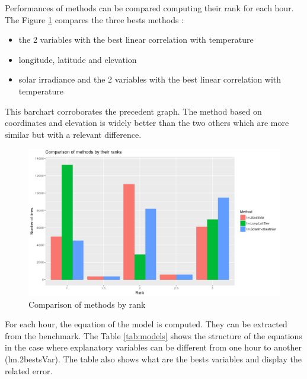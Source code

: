 \documentclass[12pt,twoside]{reedthesis}
\providecommand{\tightlist}{%
  \setlength{\itemsep}{0pt}\setlength{\parskip}{0pt}}
\theoremstyle{definition}
\theoremstyle{definition}
\theoremstyle{definition}
\theoremstyle{remark}
\begin{document}
Performances of methods can be compared computing their rank for each
hour. The Figure \ref{fig:barchart} compares the three bests methods :
\begin{itemize}
\tightlist
\item
  the 2 variables with the best linear correlation with temperature
\item
  longitude, latitude and elevation
\item
  solar irradiance and the 2 variables with the best linear correlation
  with temperature
\end{itemize}
This barchart corroborates the precedent graph. The method based on
coordinates and elevation is widely better than the two others which are
more similar but with a relevant difference.
\begin{figure}

{\centering \includegraphics[width=1\linewidth]{figure/barchart} 

}

\caption{Comparison of methods by rank}\label{fig:barchart}
\end{figure}
For each hour, the equation of the model is computed. They can be
extracted from the benchmark. The Table \ref{tab:models} shows the
structure of the equations in the case where explanatory variables can
be different from one hour to another (lm.2bestsVar). The table also
shows what are the bests variables and display the related error.
\end{document}
